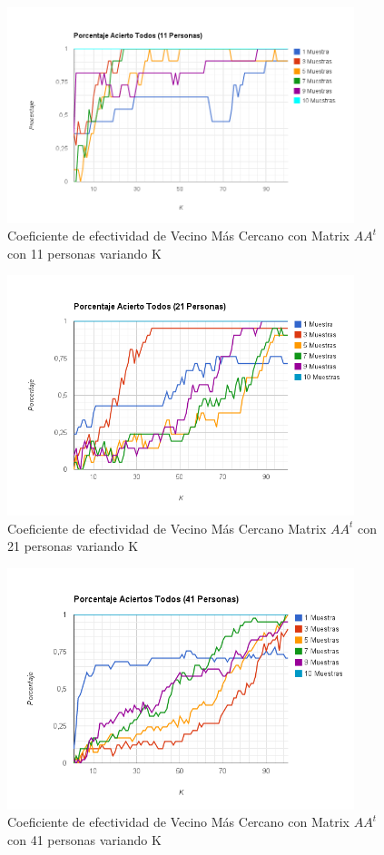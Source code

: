 \begin{figure}[H]
\includegraphics[width=0.9\textwidth]{img/imagef10.png}
     \caption{Coeficiente de efectividad de Vecino Más Cercano con Matrix $AA^t$ con 11 personas variando K}
\end{figure}

\begin{figure}[H]
\includegraphics[width=0.9\textwidth]{img/imagef11.png}
     \caption{Coeficiente de efectividad de Vecino Más Cercano Matrix $AA^t$ con 21 personas variando K}
\end{figure}

\begin{figure}[H]
\includegraphics[width=0.9\textwidth]{img/imagef12.png}
     \caption{Coeficiente de efectividad de Vecino Más Cercano con Matrix $AA^t$ con 41 personas variando K}
\end{figure}


